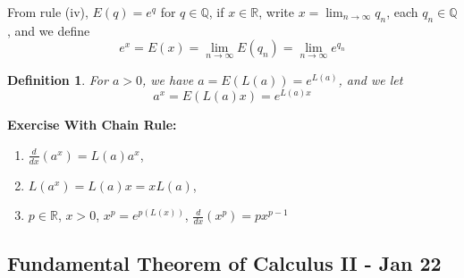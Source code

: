 \documentclass[12pt]{article}
\theoremstyle{plain}
\newtheorem{definition}{Definition}[subsection]
\newcommand{\mQ}{{\mathbb{Q}}}
\newcommand{\mR}{{\mathbb{R}}}
\begin{document}
	From rule (iv), $E(q) = e^q$ for $q \in \mQ$, 
	if $x \in \mR$, write $x = \lim_{n\to\infty} q_n$, each $q_n \in \mQ$, 
	and we define 
	\[
		e^x = E(x) = \lim_{n\to\infty} E(q_n) = \lim_{n\to\infty} e^{q_n}
	\]

	\begin{definition}
		For $a>0$, we have $a = E(L(a)) = e^{L(a)}$, and we let
		\[
			a^x = E(L(a)x) = e^{L(a) x}
		\]
	\end{definition}

	\textbf{Exercise With Chain Rule: }
	\begin{enumerate}
		\item $\frac d{dx} (a^x) = L(a)a^x$, 
		\item $L(a^x) = L(a) x = xL(a)$,
		\item $p\in\mR$, $x>0$, $x^p = e^{p(L(x))}$, 
			$\frac d{dx} (x^p) = px^{p-1}$
	\end{enumerate}



	
	\newpage
	\subsection{Fundamental Theorem of Calculus II - Jan 22}
	
\end{document}
